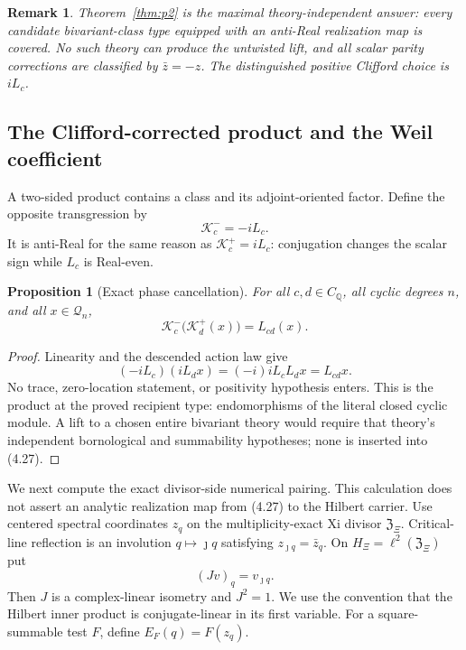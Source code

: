 \documentclass[11pt,reqno]{amsart}
\newtheorem{proposition}[theorem]{Proposition}
\newtheorem{remark}[theorem]{Remark}
\newcommand{\Q}{\mathbb Q}
\begin{document}
\begin{remark}
Theorem~\ref{thm:p2} is the maximal theory-independent answer: every candidate bivariant-class
type equipped with an anti-Real realization map is covered.  No such theory can produce the
untwisted lift, and all scalar parity corrections are classified by $\bar z=-z$.  The
distinguished positive Clifford choice is $iL_c$.
\end{remark}

\subsection{The Clifford-corrected product and the Weil coefficient}
\label{sec:cliffordweil}

A two-sided product contains a class and its adjoint-oriented factor.  Define the opposite
transgression by
\[
                     \mathcal K_c^-=-iL_c.            \tag{4.26}
\]
It is anti-Real for the same reason as $\mathcal K_c^+=iL_c$: conjugation changes the scalar sign
while $L_c$ is Real-even.

\begin{proposition}[Exact phase cancellation]\label{prop:phaseproduct}
For all $c,d\in C_\Q$, all cyclic degrees $n$, and all $x\in\mathcal Q_n$,
\[
                  \mathcal K_c^-\bigl(\mathcal K_d^+(x)\bigr)=L_{cd}(x). \tag{4.27}
\]
\end{proposition}

\begin{proof}
Linearity and the descended action law give
\[
 (-iL_c)(iL_dx)=(-i)iL_cL_dx=L_{cd}x.
\]
No trace, zero-location statement, or positivity hypothesis enters.  This is the product at the
proved recipient type: endomorphisms of the literal closed cyclic module.  A lift to a chosen
entire bivariant theory would require that theory's independent bornological and summability
hypotheses; none is inserted into (4.27).
\end{proof}

We next compute the exact divisor-side numerical pairing.  This calculation does not assert an
analytic realization map from (4.27) to the Hilbert carrier.  Use centered spectral coordinates $z_q$ on the
multiplicity-exact Xi divisor $\mathfrak Z_\Xi$.  Critical-line reflection is an involution
$q\mapsto\jmath q$ satisfying $z_{\jmath q}=\bar z_q$.  On
$H_\Xi=\ell^2(\mathfrak Z_\Xi)$ put
\[
                         (Jv)_q=v_{\jmath q}.          \tag{4.28}
\]
Then $J$ is a complex-linear isometry and $J^2=1$.  We use the convention that the Hilbert inner
product is conjugate-linear in its first variable.  For a square-summable test $F$, define
$E_F(q)=F(z_q)$.
\end{document}

